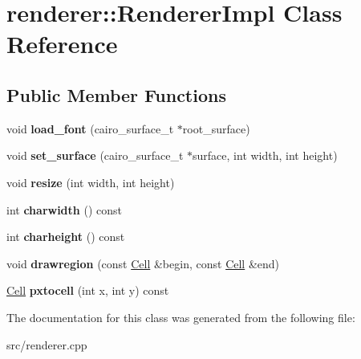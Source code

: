 \hypertarget{classrenderer_1_1RendererImpl}{}\section{renderer\+::Renderer\+Impl Class Reference}
\label{classrenderer_1_1RendererImpl}
\subsection*{Public Member Functions}
\begin{DoxyCompactItemize}
\item 
\mbox{\label{classrenderer_1_1RendererImpl_aa7c0fdf97d096b6554b0d405d57f62c1}} 
void {\bfseries load\+\_\+font} (cairo\+\_\+surface\+\_\+t $\ast$root\+\_\+surface)
\item 
\mbox{\label{classrenderer_1_1RendererImpl_abe274c7fb3c16abf7fc3328554e28a29}} 
void {\bfseries set\+\_\+surface} (cairo\+\_\+surface\+\_\+t $\ast$surface, int width, int height)
\item 
\mbox{\label{classrenderer_1_1RendererImpl_a84b05e93fdee431c3f42ac20b048b058}} 
void {\bfseries resize} (int width, int height)
\item 
\mbox{\label{classrenderer_1_1RendererImpl_ab84bb34ccea95223717e394e396f4028}} 
int {\bfseries charwidth} () const
\item 
\mbox{\label{classrenderer_1_1RendererImpl_a5412d14438dc5eb6bb954c488587608a}} 
int {\bfseries charheight} () const
\item 
\mbox{\label{classrenderer_1_1RendererImpl_ae5314d2ba420d1d215a15f091baab0c8}} 
void {\bfseries drawregion} (const \mbox{\hyperlink{structCell}{Cell}} \&begin, const \mbox{\hyperlink{structCell}{Cell}} \&end)
\item 
\mbox{\label{classrenderer_1_1RendererImpl_af4ac4862e1611266656b80ea7e4769c7}} 
\mbox{\hyperlink{structCell}{Cell}} {\bfseries pxtocell} (int x, int y) const
\end{DoxyCompactItemize}


The documentation for this class was generated from the following file\+:\begin{DoxyCompactItemize}
\item 
src/renderer.\+cpp\end{DoxyCompactItemize}
